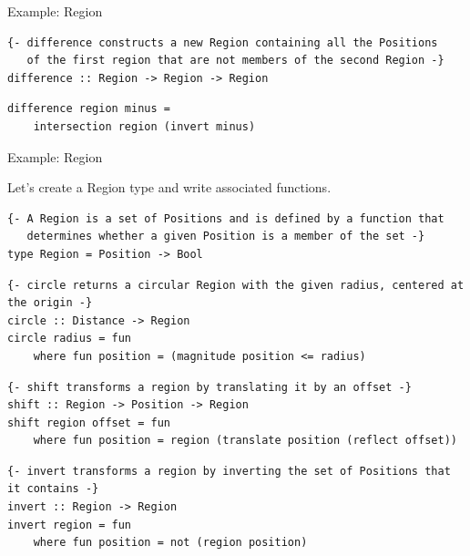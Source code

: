 \documentclass[8pt,aspectratio=169]{beamer}
\begin{document}
\begin{frame}[fragile]{Example: Region}
\vspace{3mm}

\setlength\partopsep{-\topsep}
\addtolength\partopsep{-\parskip}
\addtolength\partopsep{0.1cm}

\pause
\begin{verbatim}
{- difference constructs a new Region containing all the Positions
   of the first region that are not members of the second Region -}
difference :: Region -> Region -> Region
\end{verbatim}

\pause
\begin{verbatim}
difference region minus = 
    intersection region (invert minus)
\end{verbatim}

\setlength\partopsep{2pt}

\end{frame}


\begin{frame}[fragile]{Example: Region}

Let's create a Region type and write associated functions.
\newline

\pause
\begin{verbatim}
{- A Region is a set of Positions and is defined by a function that
   determines whether a given Position is a member of the set -}
type Region = Position -> Bool
\end{verbatim}

\pause
\begin{verbatim}
{- circle returns a circular Region with the given radius, centered at the origin -}
circle :: Distance -> Region
circle radius = fun
    where fun position = (magnitude position <= radius)
\end{verbatim}

\pause
\begin{verbatim}
{- shift transforms a region by translating it by an offset -}
shift :: Region -> Position -> Region
shift region offset = fun
    where fun position = region (translate position (reflect offset))
\end{verbatim}

\pause
\begin{verbatim}
{- invert transforms a region by inverting the set of Positions that it contains -}
invert :: Region -> Region
invert region = fun
    where fun position = not (region position)
\end{verbatim}

\end{frame}
\end{document}
